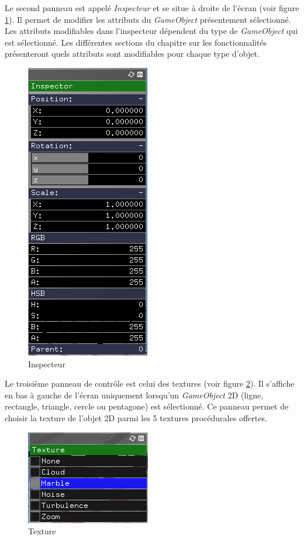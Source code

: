 Le second panneau est appelé \emph{Inspecteur} et se situe à droite de l'écran (voir figure \ref{fig:inspecteur}).
Il permet de modifier les attributs du \emph{GameObject} présentement sélectionné.
Les attributs modifiables dans l'inspecteur dépendent du type de \emph{GameObject} qui est sélectionné.
Les différentes sections du chapitre sur les fonctionnalités présenteront quels attributs sont modifiables pour chaque type d'objet.\\

\begin{figure}[H]
    \centering
	\includegraphics[scale=0.55]{fig/inspecteur.png}
	\caption{Inspecteur}
	\label{fig:inspecteur}
\end{figure}

Le troisième panneau de contrôle est celui des textures (voir figure \ref{fig:texture}).
Il s'affiche en bas à gauche de l'écran uniquement lorsqu'un \emph{GameObject} 2D (ligne, rectangle, triangle, cercle ou pentagone) est sélectionné.
Ce panneau permet de choisir la texture de l'objet 2D parmi les 5 textures procédurales offertes.

\begin{figure}[H]
    \centering
	\includegraphics[scale=0.6]{fig/texture.png}
	\caption{Texture}
	\label{fig:texture}
\end{figure}

